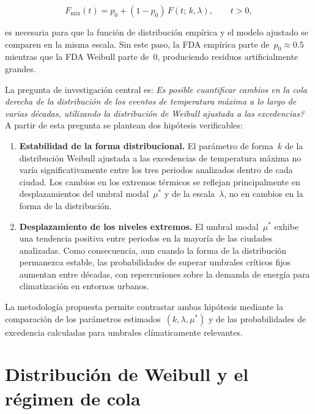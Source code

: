 \documentclass[APA,STIX1COL]{WileyNJD-v2}
\begin{document}
{\begin{equation}\label{eq:mezcla_intro}
F_{\mathrm{mix}}(t) = p_0 + (1-p_0)\,F(t;\,k,\lambda),\qquad t>0,
\end{equation}

es necesaria para que la función de distribución empírica y el modelo ajustado se comparen en la misma escala. Sin este paso,
la FDA empírica parte de~$p_0\approx 0.5$ mientras que la FDA Weibull parte de~0, produciendo residuos artificialmente grandes.

La pregunta de investigación central es: \textit{\textquestiondown Es posible cuantificar cambios en la cola derecha de la distribución de los eventos de temperatura máxima a lo largo de varias décadas, utilizando la distribución de Weibull ajustada a las excedencias?} A partir de esta pregunta se plantean dos hipótesis verificables:

\begin{enumerate}
\item[\textbf{H1.}] \textbf{Estabilidad de la forma distribucional.}
  El parámetro de forma~$k$ de la distribución Weibull ajustada a las excedencias de temperatura máxima no varía significativamente entre los tres periodos analizados dentro de cada ciudad. Los cambios en los extremos térmicos se reflejan principalmente en desplazamientos del umbral modal~$\mu^*$ y de la escala~$\lambda$, no en cambios en la forma de la distribución.

\item[\textbf{H2.}] \textbf{Desplazamiento de los niveles extremos.}
  El umbral modal~$\mu^*$ exhibe una tendencia positiva entre periodos
  en la mayor\'ia de las ciudades analizadas. Como consecuencia, aun
  cuando la forma de la distribuci\'on permanezca estable, las
  probabilidades de superar umbrales cr\'iticos fijos aumentan entre
  d\'ecadas, con repercusiones sobre la demanda de energ\'ia para
  climatizaci\'on en entornos urbanos.
\end{enumerate}

La metodolog\'ia propuesta permite contrastar ambas hip\'otesis mediante
la comparaci\'on de los par\'ametros estimados~$(k, \lambda, \mu^*)$
y de las probabilidades de excedencia calculadas para umbrales
cl\'imaticamente relevantes.

\section{Distribución de Weibull y el régimen de cola}\label{sec:weibull}

}
\end{document}
